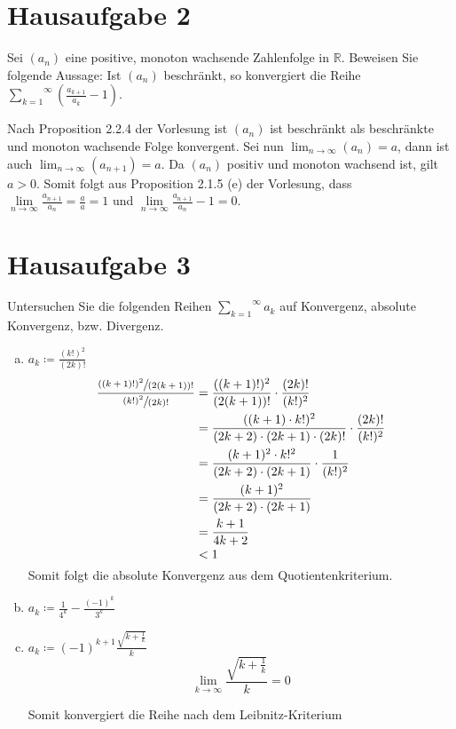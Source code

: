 \documentclass{article}
\begin{document}
\section*{Hausaufgabe 2}

Sei $\left(a_n\right)$ eine positive, monoton wachsende Zahlenfolge in $\mathbb{R}$.
Beweisen Sie folgende Aussage: Ist $\left(a_n\right)$ beschränkt, so konvergiert die Reihe
$\overset{\infty}{\underset{k=1}\sum} \left(\frac{a_{k+1}}{a_k} - 1\right)$.

Nach Proposition 2.2.4 der Vorlesung ist $(a_n)$ ist beschränkt als beschränkte und monoton wachsende Folge konvergent.
Sei nun $\lim_{n\to\infty} (a_n) = a$, dann ist auch $\lim_{n\to\infty}(a_{n+1}) = a$.
Da $(a_n)$ positiv und monoton wachsend ist, gilt $a > 0$.
Somit folgt aus Proposition 2.1.5 (e) der Vorlesung, dass
$\underset{n\to\infty}\lim \frac{a_{n+1}}{a_n} = \frac{a}{a} = 1$ und
$\underset{n\to\infty}\lim \frac{a_{n+1}}{a_n} - 1 = 0$.

\section*{Hausaufgabe 3}

Untersuchen Sie die folgenden Reihen $\overset{\infty}{\underset{k=1}\sum} a_k$ auf Konvergenz, absolute Konvergenz, bzw. Divergenz.

\begin{enumerate}[a)]
\item $a_k \coloneqq \frac{(k!)^2}{(2k)!}$
  \begin{align*}
    \frac{\sfrac{((k+1)!)^2}{(2(k+1))!}}{\sfrac{(k!)^2}{(2k)!}} &= \frac{((k+1)!)^2}{(2(k+1))!} \cdot \frac{(2k)!}{(k!)^2} \\
                                                                &= \frac{((k+1) \cdot k!)^2}{(2k+2)\cdot(2k+1)\cdot(2k)!} \cdot \frac{(2k)!}{(k!)^2} \\
                                                                &= \frac{(k+1)^2 \cdot k!^2}{(2k+2)\cdot(2k+1)} \cdot \frac{1}{(k!)^2} \\
                                                                &= \frac{(k+1)^2}{(2k+2)\cdot(2k+1)} \\
                                                                &= \frac{k+1}{4k+2} \\
                                                                &< 1
  \end{align*}
  Somit folgt die absolute Konvergenz aus dem Quotientenkriterium.
\item $a_k \coloneqq \frac{1}{4^k} - \frac{(-1)^k}{3^k}$
\item $a_k \coloneqq (-1)^{k+1} \frac{\sqrt{k+\frac{1}{k}}}{k}$
  \[
    \lim_{k\to\infty} \frac{\sqrt{k+\frac{1}{k}}}{k} = 0
  \]

  Somit konvergiert die Reihe nach dem Leibnitz-Kriterium
\end{enumerate}
\end{document}
